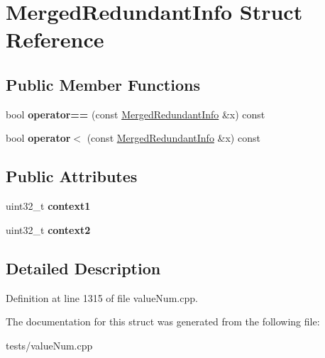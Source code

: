\hypertarget{structMergedRedundantInfo}{\section{Merged\-Redundant\-Info Struct Reference}
\label{structMergedRedundantInfo}
}
\subsection*{Public Member Functions}
\begin{DoxyCompactItemize}
\item 
\hypertarget{structMergedRedundantInfo_a50a6e872ab0d2948f398633ff9c29c68}{bool {\bfseries operator==} (const \hyperlink{structMergedRedundantInfo}{Merged\-Redundant\-Info} \&x) const }\label{structMergedRedundantInfo_a50a6e872ab0d2948f398633ff9c29c68}

\item 
\hypertarget{structMergedRedundantInfo_aae1d45108abe6ec6eaa0b94cfb1c94e4}{bool {\bfseries operator$<$} (const \hyperlink{structMergedRedundantInfo}{Merged\-Redundant\-Info} \&x) const }\label{structMergedRedundantInfo_aae1d45108abe6ec6eaa0b94cfb1c94e4}

\end{DoxyCompactItemize}
\subsection*{Public Attributes}
\begin{DoxyCompactItemize}
\item 
\hypertarget{structMergedRedundantInfo_a9c7290e9e31c0898252554e28c235606}{uint32\-\_\-t {\bfseries context1}}\label{structMergedRedundantInfo_a9c7290e9e31c0898252554e28c235606}

\item 
\hypertarget{structMergedRedundantInfo_ace3a9d1b81517c1fb5972ab53f91a622}{uint32\-\_\-t {\bfseries context2}}\label{structMergedRedundantInfo_ace3a9d1b81517c1fb5972ab53f91a622}

\end{DoxyCompactItemize}


\subsection{Detailed Description}


Definition at line 1315 of file value\-Num.\-cpp.



The documentation for this struct was generated from the following file\-:\begin{DoxyCompactItemize}
\item 
tests/value\-Num.\-cpp\end{DoxyCompactItemize}
